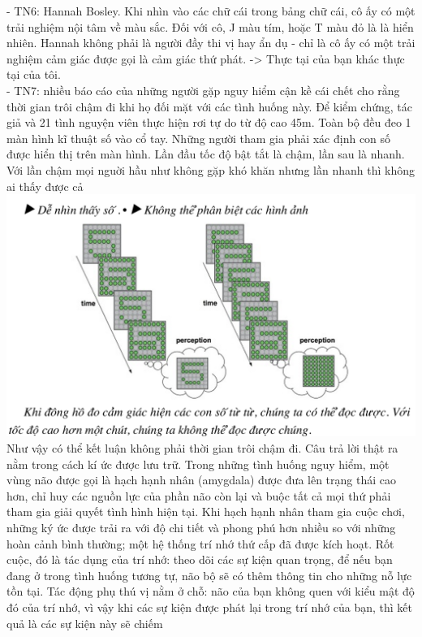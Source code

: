 \documentclass{article}
\newcommand\tab[1][1cm]{\hspace*{#1}}
\begin{document}
\tab\tab - TN6: Hannah Bosley. Khi nhìn vào các chữ cái trong
bảng chữ cái, cô ấy có một trải nghiệm nội tâm về màu sắc. Đối với cô, J
màu tím, hoặc T màu đỏ là là hiển nhiên. Hannah không phải là người đầy thi vị hay ẩn dụ - chỉ là cô ấy có một
trải nghiệm cảm giác được gọi là cảm giác thứ phát. -> Thực tại của bạn khác thực tại của tôi.\\
\tab\tab - TN7: nhiều báo cáo của những người gặp nguy hiểm cận kề cái chết cho rằng thời gian
trôi chậm đi khi họ đối mặt với các tình huống này. Để kiểm chứng, tác giả và 21 tình nguyện viên thực hiện 
rơi tự do từ độ cao 45m. Toàn bộ đều đeo 1 màn hình kĩ thuật số vào cổ tay. Những người tham gia 
phải xác định con số được hiển thị trên màn hình. Lần đầu tốc độ bật tắt là chậm, lần sau là nhanh. Với lần chậm
mọi nguời hầu như không gặp khó khăn nhưng lần nhanh thì không ai thấy được cả\\
\includegraphics[width=\textwidth]{images/Screenshot 2024-07-30 195407.png}
\tab Như vậy có thể kết luận không phải thời gian trôi chậm đi. Câu trả lời thật ra nằm trong cách kí ức
được lưu trữ.  Trong những tình huống nguy hiểm, một vùng não được gọi là hạch hạnh
nhân (amygdala) được đưa lên trạng thái cao hơn, chỉ huy các nguồn lực
của phần não còn lại và buộc tất cả mọi thứ phải tham gia giải quyết tình
hình hiện tại. Khi hạch hạnh nhân tham gia cuộc chơi, những ký ức được
trải ra với độ chi tiết và phong phú hơn nhiều so với những hoàn cảnh bình
thường; một hệ thống trí nhớ thứ cấp đã được kích hoạt. Rốt cuộc, đó là tác
dụng của trí nhớ: theo dõi các sự kiện quan trọng, để nếu bạn đang ở trong
tình huống tương tự, não bộ sẽ có thêm thông tin cho những nỗ lực tồn tại.
Tác động phụ thú vị nằm ở chỗ: não của bạn không quen với kiểu mật độ
 đó của trí nhớ, vì vậy khi các sự kiện
 được phát lại trong trí nhớ của bạn, thì kết quả là các sự kiện này sẽ chiếm
\end{document}
